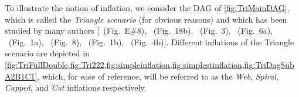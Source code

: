 To illustrate the notion of inflation, we consider the DAG of \cref{fig:TriMainDAG}, which is called the {\em Triangle scenario} (for obvious reasons) and which has been studied by many authors [\citealp{pusey2014gdag}~(Fig.~E\#8), \citealp{WoodSpekkens}~(Fig.~18b), \citealp{fritz2012bell}~(Fig.~3), \citealp{chaves2014novel}~(Fig.~6a), \citealp{Chaves2015infoquantum}~(Fig.~1a), \citealp{BilocalCorrelations}~(Fig.~8), \citealp{steudel2010ancestors}~(Fig.~1b), \citealp{chaves2014informationinference}~(Fig.~4b)].
Different inflations of the Triangle scenario are depicted in \cref{fig:TriFullDouble,fig:Tri222,fig:simpleinflation,fig:simplestinflation,fig:TriDagSubA2B1C1}, which, for ease of reference, will be referred to as the {\em Web}, {\em Spiral}, {\em Capped}, and {\em Cut} inflations respectively.

